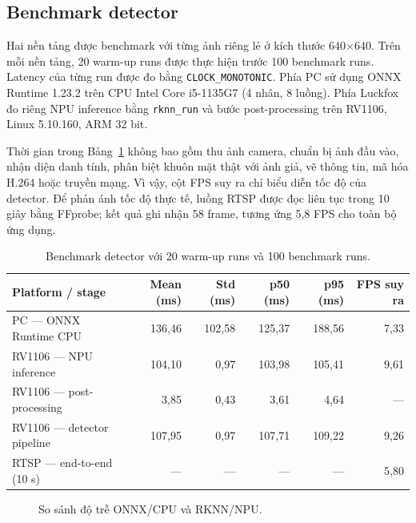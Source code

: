 \documentclass[11pt,a4paper]{article}
\begin{document}
\subsection{Benchmark detector}

Hai nền tảng được benchmark với từng ảnh riêng lẻ ở kích thước 640$\times$640. Trên mỗi nền tảng, 20 warm-up runs được thực hiện trước 100 benchmark runs. Latency của từng run được đo bằng \texttt{CLOCK\_MONOTONIC}. Phía PC sử dụng ONNX Runtime 1.23.2 trên CPU Intel Core i5-1135G7 (4 nhân, 8 luồng). Phía Luckfox đo riêng NPU inference bằng \texttt{rknn\_run} và bước post-processing trên RV1106, Linux 5.10.160, ARM 32 bit.

Thời gian trong Bảng~\ref{tab:bench} không bao gồm thu ảnh camera, chuẩn bị ảnh đầu vào, nhận diện danh tính, phân biệt khuôn mặt thật với ảnh giả, vẽ thông tin, mã hóa H.264 hoặc truyền mạng. Vì vậy, cột FPS suy ra chỉ biểu diễn tốc độ của detector. Để phản ánh tốc độ thực tế, luồng RTSP được đọc liên tục trong 10 giây bằng FFprobe; kết quả ghi nhận 58 frame, tương ứng 5,8 FPS cho toàn bộ ứng dụng.

\begin{table}[H]
\centering
\caption{Benchmark detector với 20 warm-up runs và 100 benchmark runs.}
\label{tab:bench}
\small
\begin{tabular}{>{\raggedright\arraybackslash}p{42mm}rrrrr}
\toprule
Platform / stage & Mean (ms) & Std (ms) & p50 (ms) & p95 (ms) & FPS suy ra \\
\midrule
PC --- ONNX Runtime CPU & 136,46 & 102,58 & 125,37 & 188,56 & 7,33 \\
RV1106 --- NPU inference & 104,10 & 0,97 & 103,98 & 105,41 & 9,61 \\
RV1106 --- post-processing & 3,85 & 0,43 & 3,61 & 4,64 & --- \\
RV1106 --- detector pipeline & 107,95 & 0,97 & 107,71 & 109,22 & 9,26 \\
RTSP --- end-to-end (10 s) & --- & --- & --- & --- & 5,80 \\
\bottomrule
\end{tabular}
\end{table}

\begin{figure}[H]
\centering
{}
\caption{So sánh độ trễ ONNX/CPU và RKNN/NPU.}
\label{fig:latency-comparison}
\end{figure}
\end{document}
